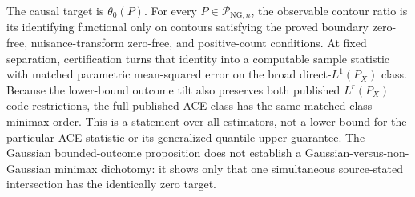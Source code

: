 The causal target is \(\theta_0(P)\).  For every \(P\in\mathcal P_{\mathrm{NG},n}\), the observable contour ratio is its identifying functional only on contours satisfying the proved boundary zero-free, nuisance-transform zero-free, and positive-count conditions.  At fixed separation, certification turns that identity into a computable sample statistic with matched parametric mean-squared error on the broad direct-\(L^1(P_X)\) class.  Because the lower-bound outcome tilt also preserves both published \(L^r(P_X)\) code restrictions, the full published ACE class has the same matched class-minimax order.  This is a statement over all estimators, not a lower bound for the particular ACE statistic or its generalized-quantile upper guarantee.  The Gaussian bounded-outcome proposition does not establish a Gaussian-versus-non-Gaussian minimax dichotomy: it shows only that one simultaneous source-stated intersection has the identically zero target.